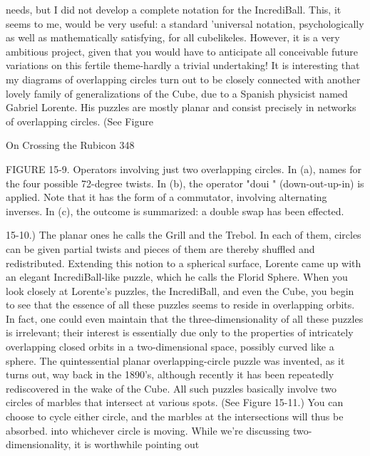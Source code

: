 needs, but I did not develop a complete notation for the IncrediBall. This, it seems
to me, would be very useful: a standard 'universal notation, psychologically as well
as mathematically satisfying, for all cubelikeles. However, it is a very ambitious
project, given that you would have to anticipate all conceivable future variations on
this fertile theme-hardly a trivial undertaking!
It is interesting that my diagrams of overlapping circles turn out to be closely
connected with another lovely family of generalizations of the Cube, due to a
Spanish physicist named Gabriel Lorente. His puzzles are mostly planar and
consist precisely in networks of overlapping circles. (See Figure




On Crossing the Rubicon                                                                348

FIGURE 15-9. Operators involving just two overlapping circles. In (a), names for
the four possible 72-degree twists. In (b), the operator "doui " (down-out-up-in) is
applied. Note that it has the form of a commutator, involving alternating inverses.
In (c), the outcome is summarized: a double swap has been effected.

15-10.) The planar ones he calls the Grill and the Trebol. In each of them, circles
can be given partial twists and pieces of them are thereby shuffled and
redistributed. Extending this notion to a spherical surface, Lorente came up with an
elegant IncrediBall-like puzzle, which he calls the Florid Sphere.
         When you look closely at Lorente's puzzles, the IncrediBall, and even the
Cube, you begin to see that the essence of all these puzzles seems to reside in
overlapping orbits. In fact, one could even maintain that the three-dimensionality
of all these puzzles is irrelevant; their interest is essentially due only to the
properties of intricately overlapping closed orbits in a two-dimensional space,
possibly curved like a sphere.
         The quintessential planar overlapping-circle puzzle was invented, as it turns
out, way back in the 1890's, although recently it has been repeatedly rediscovered
in the wake of the Cube. All such puzzles basically involve two circles of marbles
that intersect at various spots. (See Figure 15-11.) You can choose to cycle either
circle, and the marbles at the intersections will thus be absorbed. into whichever
circle is moving.
         While we're discussing two-dimensionality, it is worthwhile pointing out




